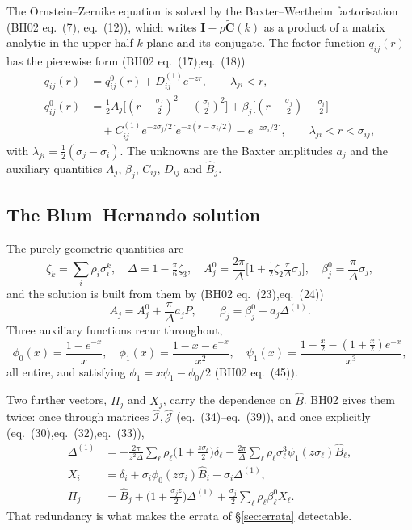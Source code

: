 \documentclass[11pt,a4paper]{article}
\newcommand{\eqBH}[1]{eq.~(#1)}
\begin{document}
The Ornstein--Zernike equation is solved by the Baxter--Wertheim
factorisation (BH02 \eqBH{7}, \eqBH{12}), which writes
$\bm I-\rho\tilde{\bm C}(k)$ as a product of a matrix analytic in the upper
half $k$-plane and its conjugate. The factor function $q_{ij}(r)$ has the
piecewise form (BH02 \eqBH{17},\eqBH{18})
\begin{align}
  q_{ij}(r)&=q^0_{ij}(r)+D^{(1)}_{ij}e^{-zr},\qquad \lambda_{ji}<r,\\
  q^0_{ij}(r)&=\tfrac12A_j\big[(r-\tfrac{\sigma_j}{2})^2-(\tfrac{\sigma_i}{2})^2\big]
   +\beta_j\big[(r-\tfrac{\sigma_j}{2})-\tfrac{\sigma_i}{2}\big]\nonumber\\
   &\quad+C^{(1)}_{ij}e^{-z\sigma_j/2}\big[e^{-z(r-\sigma_j/2)}-e^{-z\sigma_i/2}\big],
   \qquad \lambda_{ji}<r<\sigma_{ij},
\end{align}
with $\lambda_{ji}=\tfrac12(\sigma_j-\sigma_i)$. The unknowns are the Baxter
amplitudes $a_j$ and the auxiliary quantities $A_j$, $\beta_j$,
$C_{ij}$, $D_{ij}$ and $\hat B_j$.

\subsection{The Blum--Hernando solution}

The purely geometric quantities are
\begin{equation}
  \zeta_k=\sum_i\rho_i\sigma_i^k,\quad \Delta=1-\tfrac{\pi}{6}\zeta_3,\quad
  A^0_j=\frac{2\pi}{\Delta}\Big[1+\tfrac12\zeta_2\tfrac{\pi}{\Delta}\sigma_j\Big],
  \quad \beta^0_j=\frac{\pi}{\Delta}\sigma_j,
\end{equation}
and the solution is built from them by (BH02 \eqBH{23},\eqBH{24})
\begin{equation}
  A_j=A^0_j+\frac{\pi}{\Delta}a_jP,\qquad \beta_j=\beta^0_j+a_j\Delta^{(1)}.
\end{equation}
Three auxiliary functions recur throughout,
\begin{equation}
  \phi_0(x)=\frac{1-e^{-x}}{x},\quad
  \phi_1(x)=\frac{1-x-e^{-x}}{x^2},\quad
  \psi_1(x)=\frac{1-\tfrac{x}{2}-(1+\tfrac{x}{2})e^{-x}}{x^3},
  \label{eq:phipsi}
\end{equation}
all entire, and satisfying $\phi_1=x\psi_1-\phi_0/2$ (BH02 \eqBH{45}).

Two further vectors, $\Pi_j$ and $X_j$, carry the dependence on $\hat B$. BH02
gives them twice: once through matrices $\hat{\mathcal I},\hat{\mathcal J}$
(\eqBH{34}--\eqBH{39}), and once explicitly (\eqBH{30},\eqBH{32},\eqBH{33}),
\begin{align}
  \Delta^{(1)}&=-\frac{2\pi}{z^2\Delta}\sum_\ell\rho_\ell
     \Big(1+\tfrac{z\sigma_\ell}{2}\Big)\delta_\ell
     -\frac{2\pi}{\Delta}\sum_\ell\rho_\ell\sigma_\ell^3\psi_1(z\sigma_\ell)\hat B_\ell,
     \label{eq:BH30}\\
  X_i&=\delta_i+\sigma_i\phi_0(z\sigma_i)\hat B_i+\sigma_i\Delta^{(1)},
     \label{eq:BH33}\\
  \Pi_j&=\hat B_j+\Big(1+\tfrac{\sigma_jz}{2}\Big)\Delta^{(1)}
     +\tfrac{\sigma_j}{2}\sum_\ell\rho_\ell\beta^0_\ell X_\ell.
     \label{eq:BH32}
\end{align}
That redundancy is what makes the errata of \S\ref{sec:errata} detectable.
\end{document}
